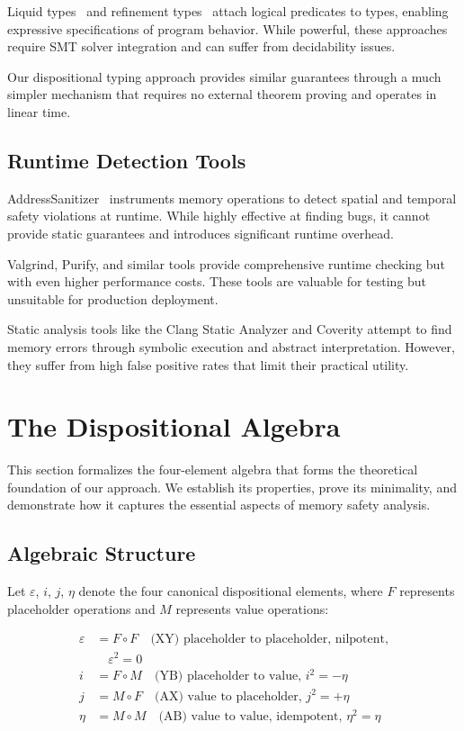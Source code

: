 \documentclass[journal]{IEEEtran}
\begin{document}
Liquid types~\cite{rondon2008liquid} and refinement types~\cite{vazou2014refinement} attach logical predicates to types, enabling expressive specifications of program behavior. While powerful, these approaches require SMT solver integration and can suffer from decidability issues.

Our dispositional typing approach provides similar guarantees through a much simpler mechanism that requires no external theorem proving and operates in linear time.

\subsection{Runtime Detection Tools}

AddressSanitizer~\cite{serebryany2012addresssanitizer} instruments memory operations to detect spatial and temporal safety violations at runtime. While highly effective at finding bugs, it cannot provide static guarantees and introduces significant runtime overhead.

Valgrind, Purify, and similar tools provide comprehensive runtime checking but with even higher performance costs. These tools are valuable for testing but unsuitable for production deployment.

Static analysis tools like the Clang Static Analyzer and Coverity attempt to find memory errors through symbolic execution and abstract interpretation. However, they suffer from high false positive rates that limit their practical utility.

\section{The Dispositional Algebra}
\label{sec:algebra}

This section formalizes the four-element algebra that forms the theoretical foundation of our approach. We establish its properties, prove its minimality, and demonstrate how it captures the essential aspects of memory safety analysis.

\subsection{Algebraic Structure}

Let $\varepsilon$, $i$, $j$, $\eta$ denote the four canonical dispositional elements, where $F$ represents placeholder operations and $M$ represents value operations:

\begin{align}
\varepsilon &= F \circ F \quad \text{(XY) placeholder to placeholder, nilpotent,} \nonumber \\
&\quad \varepsilon^2 = 0 \\
i &= F \circ M \quad \text{(YB) placeholder to value, } i^2 = -\eta \\
j &= M \circ F \quad \text{(AX) value to placeholder, } j^2 = +\eta \\
\eta &= M \circ M \quad \text{(AB) value to value, idempotent, } \eta^2 = \eta
\end{align}
\end{document}
